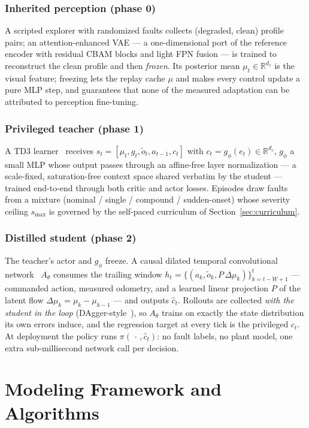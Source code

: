\documentclass[journal]{IEEEtran}
\newcommand{\ehat}{\hat{c}}
\newcommand{\R}{\mathbb{R}}
\begin{document}
\subsubsection{Inherited perception (phase 0)}
A scripted explorer with randomized faults collects (degraded, clean)
profile pairs; an attention-enhanced VAE --- a one-dimensional port of the
reference encoder with residual CBAM blocks and light FPN fusion --- is
trained to reconstruct the clean profile and then \emph{frozen}. Its
posterior mean $\mu_t \in \R^{d_z}$ is the visual feature; freezing lets the
replay cache $\mu$ and makes every control update a pure MLP step, and
guarantees that none of the measured adaptation can be attributed to
perception fine-tuning.

\subsubsection{Privileged teacher (phase 1)}
A TD3 learner~\cite{Fujimoto2018TD3} receives
$s_t = [\mu_t, g_t, \tilde{o}_t, a_{t-1}, c_t]$ with
$c_t = g_\phi(e_t) \in \R^{d_c}$, $g_\phi$ a small MLP whose output passes
through an affine-free layer normalization --- a scale-fixed, saturation-free
context space shared verbatim by the student --- trained end-to-end through
both critic and actor losses. Episodes draw faults from a
mixture (nominal / single / compound / sudden-onset) whose severity ceiling
$s_{\max}$ is governed by the self-paced curriculum of
Section~\ref{sec:curriculum}.

\subsubsection{Distilled student (phase 2)}
The teacher's actor and $g_\phi$ freeze. A causal dilated temporal
convolutional network~\cite{Bai2018TCN} $A_\theta$ consumes the trailing
window $h_t = \{(a_{k}, \tilde{o}_{k}, P\,\Delta\mu_{k})\}_{k=t-W+1}^{t}$
--- commanded action, measured odometry, and a learned linear projection
$P$ of the latent flow $\Delta\mu_k = \mu_k - \mu_{k-1}$ --- and outputs
$\ehat_t$. Rollouts are collected \emph{with the student in the loop}
(DAgger-style~\cite{Ross2011DAgger}), so $A_\theta$ trains on exactly the
state distribution its own errors induce, and the regression target at every
tick is the privileged $c_t$. At deployment the policy runs
$\pi(\,\cdot\,, \ehat_t)$: no fault labels, no plant model, one extra
sub-millisecond network call per decision.

\section{Modeling Framework and Algorithms}\label{sec:model}
\end{document}

